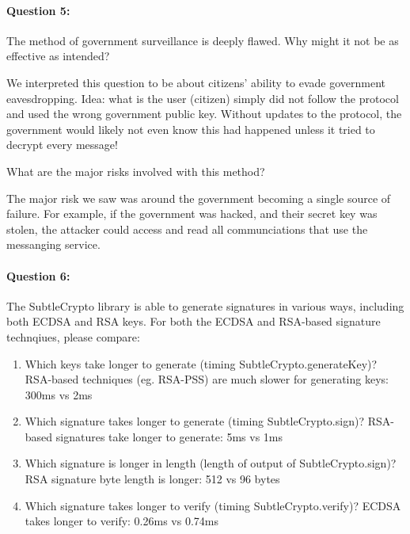 \documentclass[12pt,letterpaper,twoside]{article}
\begin{document}
\paragraph{Question 5: } The method of government surveillance is deeply
flawed. Why might it not be as effective as intended? 

{\color{purple} We interpreted this question to be about citizens' ability to 
evade government eavesdropping. Idea: what is the user (citizen) simply did not 
follow the protocol and used the wrong government public key. Without updates
to the protocol, the government would likely not even know this had happened
unless it tried to decrypt every message!}

What are the major risks involved with this method?

{\color{purple} The major risk we saw was around the government becoming a single 
source of failure. For example, if the government was hacked, and their secret key was
stolen, the attacker could access and read all communciations that use the messanging
service. }


\paragraph{Question 6: } The SubtleCrypto library is able to generate signatures
in various ways, including both ECDSA and RSA keys. For both the ECDSA and RSA-based
signature technqiues, please compare:

\begin{enumerate}
    \item Which keys take longer to generate (timing {\color{blue} SubtleCrypto.generateKey})?
    {\color{purple} RSA-based techniques (eg. RSA-PSS) are much slower
    for generating keys: 300ms vs 2ms }

    \item Which signature takes longer to generate (timing {\color{blue} SubtleCrypto.sign})? 
    {\color{purple} RSA-based signatures take longer to generate: 5ms vs 1ms }

    \item Which signature is longer in length (length of output of {\color{blue} SubtleCrypto.sign})?
    {\color{purple} RSA signature byte length is longer: 512 vs 96 bytes}

    \item Which signature takes longer to verify (timing {\color{blue} SubtleCrypto.verify})?
    {\color{purple} ECDSA takes longer to verify: 0.26ms vs 0.74ms}

\end{enumerate}
\end{document}
